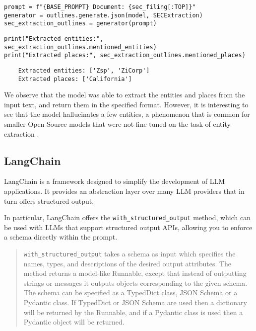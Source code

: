 \begin{verbatim}
prompt = f"{BASE_PROMPT} Document: {sec_filing[:TOP]}"
generator = outlines.generate.json(model, SECExtraction)
sec_extraction_outlines = generator(prompt)
\end{verbatim}

\begin{verbatim}
print("Extracted entities:", sec_extraction_outlines.mentioned_entities)
print("Extracted places:", sec_extraction_outlines.mentioned_places)
\end{verbatim}

\begin{verbatim}
    Extracted entities: ['Zsp', 'ZiCorp']
    Extracted places: ['California']
\end{verbatim}

We observe that the model was able to extract the entities and places from the input text, and return them in the specified format. However, it is interesting to see that the model hallucinates a few entities, a phenomenon that is common for smaller Open Source models that were not fine-tuned on the task of entity extraction .
\subsection{LangChain}

LangChain \cite{langchain_github} is a framework designed to simplify the development of LLM applications. It provides an abstraction layer over many LLM providers that in turn offers structured output.

In particular, LangChain offers the \texttt{with\_structured\_output} method, which can be used with LLMs that support structured output APIs, allowing you to enforce a schema directly within the prompt.

\begin{quote}
\texttt{with\_structured\_output} takes a schema as input which specifies the names, types, and descriptions of the desired output attributes. The method returns a model-like Runnable, except that instead of outputting strings or messages it outputs objects corresponding to the given schema. The schema can be specified as a TypedDict class, JSON Schema or a Pydantic class. If TypedDict or JSON Schema are used then a dictionary will be returned by the Runnable, and if a Pydantic class is used then a Pydantic object will be returned.
\end{quote}

